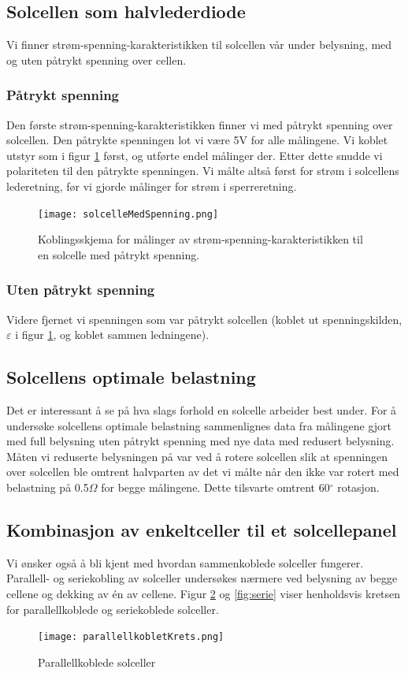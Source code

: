 \documentclass[a4paper,11pt, twocolumn]{article}
\begin{document}
\subsection{Solcellen som halvlederdiode}
Vi finner strøm-spenning-karakteristikken til solcellen vår under belysning, med og uten påtrykt spenning over cellen.
\subsubsection{Påtrykt spenning}
Den første strøm-spenning-karakteristikken finner vi med påtrykt spenning over solcellen. Den påtrykte spenningen lot vi være 5V for alle målingene. Vi koblet utstyr som i figur \ref{fig:solcelleMedSpenning} først, og utførte endel målinger der. Etter dette snudde vi polariteten til den påtrykte spenningen. Vi målte altså først for strøm i solcellens lederetning, før vi gjorde målinger for strøm i sperreretning.

\begin{figure}[!ht]
	\texttt{[image: solcelleMedSpenning.png]}
	\caption{Koblingsskjema for målinger av strøm-spenning-karakteristikken til en solcelle med påtrykt spenning.}
	\label{fig:solcelleMedSpenning}
\end{figure}

\subsubsection{Uten påtrykt spenning}
Videre fjernet vi spenningen som var påtrykt solcellen (koblet ut spenningskilden, $\varepsilon$ i figur \ref{fig:solcelleMedSpenning}, og koblet sammen ledningene).

\subsection{Solcellens optimale belastning}
Det er interessant å se på hva slags forhold en solcelle arbeider best under.
For å undersøke solcellens optimale belastning sammenlignes data fra målingene gjort med full belysning uten påtrykt spenning med nye data med redusert belysning. Måten vi reduserte belysningen på var ved å rotere solcellen slik at spenningen over solcellen ble omtrent halvparten av det vi målte når den ikke var rotert med belastning på 0.5$\Omega$ for begge målingene. Dette tilsvarte omtrent 60$^\circ$ rotasjon.
\subsection{Kombinasjon av enkeltceller til et solcellepanel}
Vi ønsker også å bli kjent med hvordan sammenkoblede solceller fungerer. Parallell- og seriekobling av solceller undersøkes nærmere ved belysning av begge cellene og dekking av \'en av cellene. Figur \ref{fig:parallell} og \ref{fig:serie} viser henholdsvis kretsen for parallellkoblede og seriekoblede solceller.
\begin{figure}[!ht]
	\texttt{[image: parallellkobletKrets.png]}
	\caption{Parallellkoblede solceller}
	\label{fig:parallell}
\end{figure}
\end{document}
